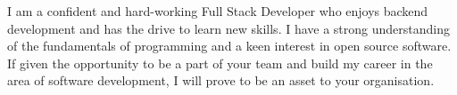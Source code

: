 

\begin{cvparagraph}

I am a confident and hard-working Full Stack Developer who enjoys backend development and has the drive to learn new skills. 
I have a strong understanding of the fundamentals of programming and a keen interest in open source software. 
If given the opportunity to be a part of your team and build my career in the area of software development, I will prove to be an asset to your organisation.

\end{cvparagraph}
